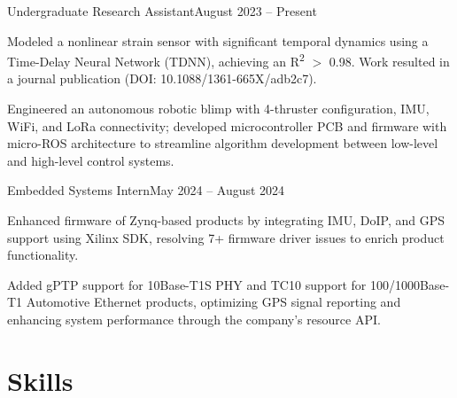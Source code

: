     {Undergraduate Research Assistant}{August 2023 -- Present}
\begin{bullets}
  \item Modeled a nonlinear strain sensor with significant temporal dynamics using a Time-Delay Neural Network (TDNN), achieving an R\textsuperscript{2} $>$ 0.98. Work resulted in a journal publication (DOI: 10.1088/1361-665X/adb2c7).
  \item Engineered an autonomous robotic blimp with 4-thruster configuration, IMU, WiFi, and LoRa connectivity; developed microcontroller PCB and firmware with micro-ROS architecture to streamline algorithm development between low-level and high-level control systems.
\end{bullets}

    {Embedded Systems Intern}{May 2024 -- August 2024}
\begin{bullets}
  \item Enhanced firmware of Zynq-based products by integrating IMU, DoIP, and GPS support using Xilinx SDK, resolving 7+ firmware driver issues to enrich product functionality.
  \item Added gPTP support for 10Base-T1S PHY and TC10 support for 100/1000Base-T1 Automotive Ethernet products, optimizing GPS signal reporting and enhancing system performance through the company's resource API.
\end{bullets}

\section*{Skills}





